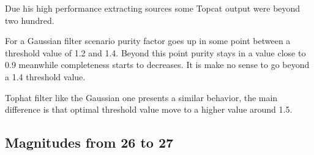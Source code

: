 \documentclass{article}
\begin{document}
Due his high performance extracting sources some Topcat output were beyond two hundred.  

For a Gaussian filter scenario purity factor goes up in some point between a threshold value of 1.2 and 1.4. Beyond this point purity stays in a value close to 0.9 meanwhile completeness starts to decreases. It is make no sense to go beyond a 1.4 threshold value.
\par
Tophat filter like the Gaussian one presents a similar behavior, the main difference is that optimal threshold value move to a higher value around 1.5.

%
%
\subsection{Magnitudes from 26 to 27}

\end{document}
